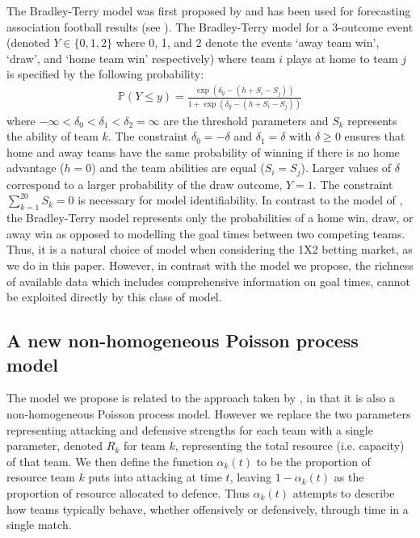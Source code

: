 The Bradley-Terry model was first proposed by \cite{BradleyTerry1952} and has been used for forecasting association
football results (see \cite{CattelanVarinFirth2013, KnorrHeld2000, FahrmeirTutz1994}). The Bradley-Terry model for a
3-outcome event (denoted \(Y \in \{0, 1, 2\}\) where 0, 1, and 2 denote the events `away team win', `draw', and `home
team win' respectively) where team \(i\) plays at home to team \(j\) is specified by the following probability:
\begin{align}
\mathbb{P}(Y \leq y) = \frac{\exp(\delta_y - (h + S_i - S_j))}{1 + \exp(\delta_y - (h + S_i - S_j))}
\end{align}
where \(-\infty < \delta_0 < \delta_1 < \delta_2 = \infty\) are the threshold parameters and \(S_k\) represents the
ability of team \(k\). The constraint \(\delta_0 = -\delta\) and \(\delta_1 = \delta\) with \(\delta \geq 0\) ensures
that home and away teams have the same probability of winning if there is no home advantage (\(h = 0\)) and the team
abilities are equal (\(S_i = S_j\)). Larger values of \(\delta\) correspond to a larger probability of the draw outcome,
\(Y = 1\). The constraint \(\sum_{k=1}^{20} S_k = 0\) is necessary for model identifiability. In contrast to the model
of \cite{DixonRobinson1998}, the Bradley-Terry model represents only the probabilities of a home win, draw, or away win
as opposed to modelling the goal times between two competing teams. Thus, it is a natural choice of model when
considering the 1X2 betting market, as we do in this paper. However, in contrast with the model we propose, the richness
of available data which includes comprehensive information on goal times, cannot be exploited directly by this class of
model.

\subsection{A new non-homogeneous Poisson process model} 
\label{model}

The model we propose is related to the approach taken by \cite{DixonRobinson1998}, in that it is also a non-homogeneous
Poisson process model. However we replace the two parameters representing attacking and defensive strengths for each
team with a single parameter, denoted \(R_k\) for team \(k\), representing the total resource (i.e. capacity) of that
team. We then define the function \(\alpha_k(t)\) to be the proportion of resource team \(k\) puts into attacking at
time \(t\), leaving \(1 - \alpha_k(t)\) as the proportion of resource allocated to defence. Thus \(\alpha_k(t)\)
attempts to describe how teams typically behave, whether offensively or defensively, through time in a single match.

